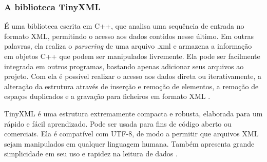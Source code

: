 \subsubsection{A biblioteca TinyXML}
\label{tinyXML}
%
É uma biblioteca escrita em C++, que analisa uma sequência de entrada no formato XML, permitindo o acesso aos dados contidos nesse último. Em outras palavras, ela realiza o \textit{parsering} de uma arquivo .xml e armazena a informação em objetos C++ que podem ser manipulados livremente. Ela pode ser facilmente integrada em outros programas, bastando apenas adicionar seus arquivos ao projeto. Com ela é possível realizar o acesso aos dados direta ou iterativamente, a alteração da estrutura através de inserção e remoção de elementos, a remoção de espaços duplicados e a gravação para ficheiros em formato XML \cite{TinyXMLTutorial}.
\par
TinyXML é uma estrutura extremamente compacta e robusta, elaborada para um rápido e fácil aprendizado. Pode ser usada para fins de código aberto ou comerciais. Ela é compatível com UTF-8, de modo a permitir que arquivos XML sejam manipulados em qualquer linguagem humana. Também apresenta grande simplicidade em seu uso e rapidez na leitura de dados \cite{TinyXMLTutorial}.
%
%
